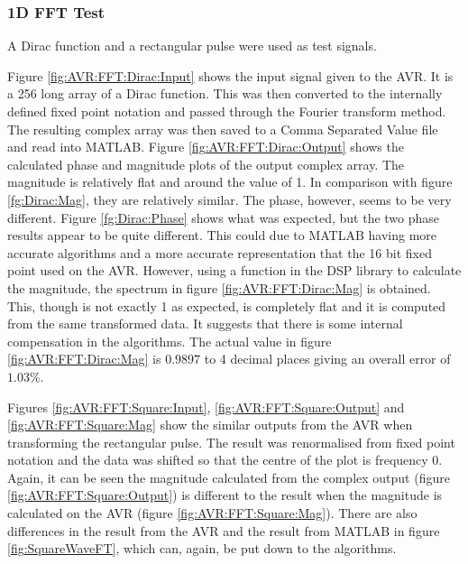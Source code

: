 \subsubsection{1D FFT Test}
A Dirac function and a rectangular pulse were used as test signals. 

Figure \ref{fig:AVR:FFT:Dirac:Input} shows the input signal given to the AVR. It is a 256 long array of a Dirac function. This was then converted to the internally defined fixed point notation and passed through the Fourier transform method. The resulting complex array was then saved to a Comma Separated Value file and read into MATLAB. Figure \ref{fig:AVR:FFT:Dirac:Output} shows the calculated phase and magnitude plots of the output complex array. The magnitude is relatively flat and around the value of 1. In comparison with figure \ref{fg:Dirac:Mag}, they are relatively similar. The phase, however, seems to be very different. Figure \ref{fg:Dirac:Phase} shows what was expected, but the two phase results appear to be quite different. This could due to MATLAB having more accurate algorithms and a more accurate representation that the 16 bit fixed point used on the AVR. However, using a function in the DSP library to calculate the magnitude, the spectrum in figure \ref{fig:AVR:FFT:Dirac:Mag} is obtained. This, though is not exactly 1 as expected, is completely flat and it is computed from the same transformed data. It suggests that there is some internal compensation in the algorithms. The actual value in figure \ref{fig:AVR:FFT:Dirac:Mag} is $0.9897$ to 4 decimal places giving an overall error of $1.03\%$. 

Figures \ref{fig:AVR:FFT:Square:Input}, \ref{fig:AVR:FFT:Square:Output} and \ref{fig:AVR:FFT:Square:Mag} show the similar outputs from the AVR when transforming the rectangular pulse. The result was renormalised from fixed point notation and the data was shifted so that the centre of the plot is frequency 0.  Again, it can be seen the magnitude calculated from the complex output (figure \ref{fig:AVR:FFT:Square:Output}) is different to the result when the magnitude is calculated on the AVR (figure \ref{fig:AVR:FFT:Square:Mag}). There are also differences in the result from the AVR and the result from MATLAB in figure \ref{fig:SquareWaveFT}, which can, again, be put down to the algorithms. 

